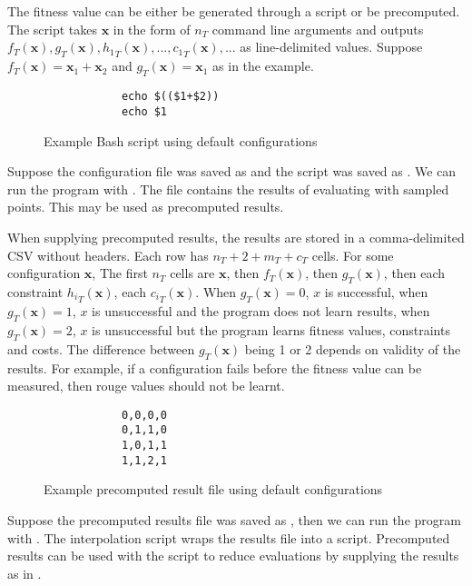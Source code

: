 \documentclass[10pt,a4paper]{article}
\begin{document}
The fitness value can be either be generated through a script or be precomputed. The script takes $\mathbf{x}$ in the form of $n_T$ command line arguments and outputs $f_T(\mathbf{x}),g_T(\mathbf{x}),{h_1}_T(\mathbf{x}),...,{c_1}_T(\mathbf{x}),...$ as line-delimited values. Suppose $f_T(\mathbf{x})=\mathbf{x}_1+\mathbf{x}_2$ and $g_T(\mathbf{x})=\mathbf{x}_1$ as in the example.

\begin{figure}[H]
	\begin{framed}
		\begin{verbatim}
			echo $(($1+$2))
			echo $1
		\end{verbatim}
	\end{framed}
	\caption{Example Bash script using default configurations}
\end{figure}

Suppose the configuration file was saved as  and the script was saved as . We can run the program with . The file  contains the results of evaluating  with sampled points. This may be used as precomputed results.

When supplying precomputed results, the results are stored in a comma-delimited CSV without headers. Each row has $n_T+2+m_T+c_T$ cells. For some configuration $\mathbf{x}$, The first $n_T$ cells are $\mathbf{x}$, then $f_T(\mathbf{x})$, then $g_T(\mathbf{x})$, then each constraint ${h_i}_T(\mathbf{x})$, each ${c_i}_T(\mathbf{x})$. When $g_T(\mathbf{x})=0$, $x$ is successful, when $g_T(\mathbf{x})=1$, $x$ is unsuccessful and the program does not learn results, when $g_T(\mathbf{x})=2$, $x$ is unsuccessful but the program learns fitness values, constraints and costs. The difference between $g_T(\mathbf{x})$ being 1 or 2 depends on validity of the results. For example, if a configuration fails before the fitness value can be measured, then rouge values should not be learnt.

\begin{figure}[H]
	\begin{framed}
		\begin{verbatim}
			0,0,0,0
			0,1,1,0
			1,0,1,1
			1,1,2,1
		\end{verbatim}
	\end{framed}
	\caption{Example precomputed result file using default configurations}
\end{figure}

Suppose the precomputed results file was saved as , then we can run the program with . The interpolation script wraps the results file into a script. Precomputed results can be used with the script to reduce evaluations by supplying the results as in .
\end{document}
